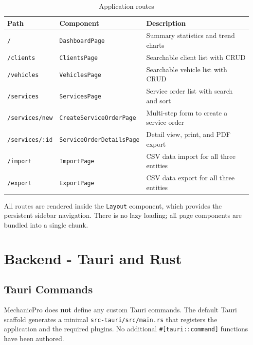 \documentclass[12pt, a4paper]{report}
\begin{document}
	\begin{table}[H]
		\centering
		\begin{tabularx}{\textwidth}{l l X}
			\toprule
			\textbf{Path}           & \textbf{Component}              & \textbf{Description} \\
			\midrule
			\texttt{/}              & \texttt{DashboardPage}          & Summary statistics and trend charts \\
			\texttt{/clients}       & \texttt{ClientsPage}            & Searchable client list with CRUD \\
			\texttt{/vehicles}      & \texttt{VehiclesPage}           & Searchable vehicle list with CRUD \\
			\texttt{/services}      & \texttt{ServicesPage}           & Service order list with search and sort \\
			\texttt{/services/new}  & \texttt{CreateServiceOrderPage} & Multi-step form to create a service order \\
			\texttt{/services/:id}  & \texttt{ServiceOrderDetailsPage}& Detail view, print, and PDF export \\
			\texttt{/import}        & \texttt{ImportPage}             & CSV data import for all three entities \\
			\texttt{/export}        & \texttt{ExportPage}             & CSV data export for all three entities \\
			\bottomrule
		\end{tabularx}
		\caption{Application routes}
		\label{tab:routes}
	\end{table}

	All routes are rendered inside the \texttt{Layout} component, which provides
	the persistent sidebar navigation. There is no lazy loading; all page
	components are bundled into a single chunk.

	\section{Backend - Tauri and Rust}

	\subsection{Tauri Commands}
	MechanicPro does \textbf{not} define any custom Tauri commands. The default
	Tauri scaffold generates a minimal \texttt{src-tauri/src/main.rs} that
	registers the application and the required plugins. No additional
	\texttt{\#[tauri::command]} functions have been authored.
\end{document}
